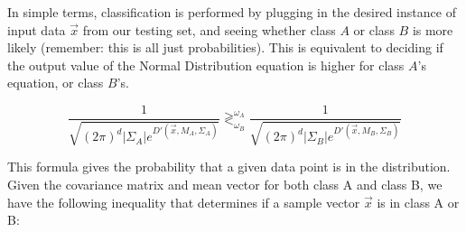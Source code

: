 \documentclass{article}
\begin{document}
In simple terms, classification is performed by plugging in the
desired instance of input data $\vec{x}$ from our testing set, and
seeing whether class $A$ or class $B$ is more likely (remember: this is all just
probabilities). This is equivalent to deciding if the output value of the Normal
Distribution equation is higher for class $A$'s equation, or class $B$'s.

\begin{displaymath}
  \dfrac{1}{\sqrt{(2\pi)^d |\Sigma_A| e^{D'(\vec{x},M_A,\Sigma_A)}}} 
  \gtrless^{\omega_A}_{\omega_B}
  \dfrac{1}{\sqrt{(2\pi)^d |\Sigma_B| e^{D'(\vec{x},M_B,\Sigma_B)}}}
\end{displaymath}

This formula gives the probability that a given data point is in the
distribution.  Given the covariance matrix and mean vector for both
class A and class B, we have the following inequality that determines
if a sample vector $\vec{x}$ is in class A or B:
\end{document}
